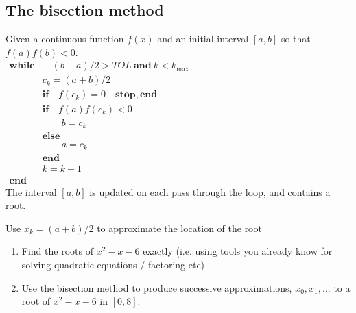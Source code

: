 \documentclass[12pt,letterpaper,noanswers]{exam}
\def\mbf{\mathbf}
\begin{document}
\subsection*{The bisection method}

    \begin{minipage}{15cm}
      Given a continuous function $f(x)$ and an initial interval $[a,b]$ so that $f(a)f(b) < 0$.
      \begin{align*}
        \mbf{while} & \quad (b-a)/2 > TOL \ \mbf{ and }\ k < k_{\text{max}}\hspace{4in}\\
      & c_k=(a+b)/2 \\
      & \mbf{if} \quad f(c_k) = 0 \quad \mbf{stop}, \mbf{ end}\\
      & \mbf{if} \quad f(a)f(c_k)<0\\
      & \qquad b=c_k \\
      & \mbf{else} \\ 
      & \qquad a=c_k \\
      & \mbf{end}\\ 
      & k = k + 1 \\
      \mbf{end} &
      \end{align*}
      The interval $[a,b]$ is updated on each pass through the loop, and contains a root.
      
      Use $x_k = (a+b)/2$ to approximate the location of the root 
   \end{minipage}

\begin{enumerate}[resume=classQ]
\item Find the roots of $x^2-x-6$ exactly (i.e. using tools you already know for solving quadratic equations / factoring etc)
\vspace{1in}

\item Use the bisection method to produce successive approximations, $x_0, x_1, ...$ to a root of $x^2-x-6$ in $[0,8]$.
\vspace{1in}

\end{enumerate}
\end{document}
